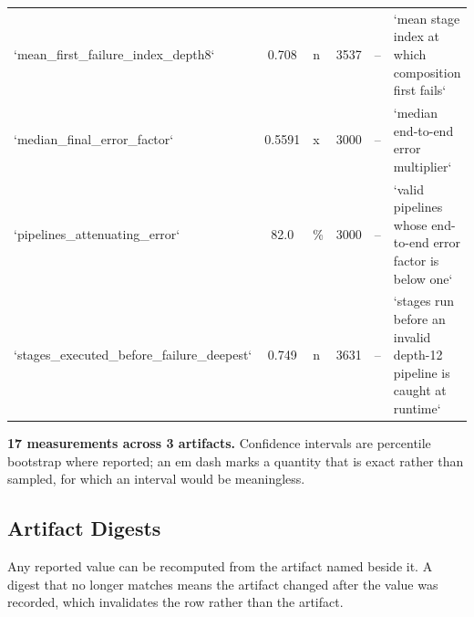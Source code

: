 \documentclass[10pt,journal,compsoc,twocolumn]{IEEEtran}
\begin{document}
\begin{table}[htbp]
{\begin{tabular}{lclcll}
`mean\_first\_failure\_index\_depth8` & 0.708 & n & 3537 & -- & `mean stage index at which composition first fails` \\
`median\_final\_error\_factor` & 0.5591 & x & 3000 & -- & `median end-to-end error multiplier` \\
`pipelines\_attenuating\_error` & 82.0 & \% & 3000 & -- & `valid pipelines whose end-to-end error factor is below one` \\
`stages\_executed\_before\_failure\_deepest` & 0.749 & n & 3631 & -- & `stages run before an invalid depth-12 pipeline is caught at runtime` \\
\bottomrule
\end{tabular}}
\end{table}

\textbf{17 measurements across 3 artifacts.} Confidence intervals are percentile bootstrap where reported; an em dash marks a quantity that is exact rather than sampled, for which an interval would be meaningless.


\subsection{Artifact Digests}
\begin{table}[htbp]
\centering
{}
\end{table}

Any reported value can be recomputed from the artifact named beside it. A digest that no longer matches means the artifact changed after the value was recorded, which invalidates the row rather than the artifact.


\par\vspace{0.5em}
\balance


\end{document}
